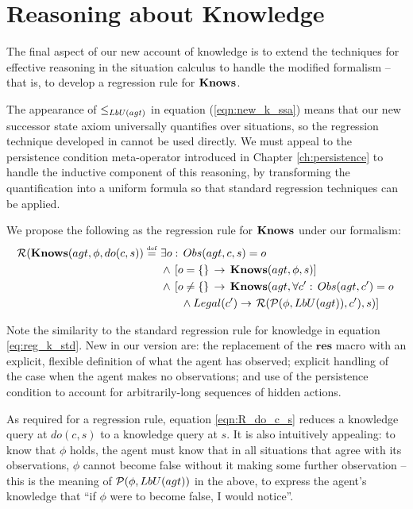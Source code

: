 \section{Reasoning about Knowledge\label{sec:Knowledge:Regression}}

The final aspect of our new account of knowledge is to extend the
techniques for effective reasoning in the situation calculus to handle
the modified formalism -- that is, to develop a regression rule for
$\mathbf{Knows}$.

The appearance of $\leq_{LbU(agt)}$ in equation (\ref{eqn:new_k_ssa})
means that our new successor state axiom universally quantifies over
situations, so the regression technique developed in \citep{scherl03sc_knowledge}
cannot be used directly. We must appeal to the persistence condition
meta-operator introduced in Chapter \ref{ch:persistence} to handle
the inductive component of this reasoning, by transforming the quantification
into a uniform formula so that standard regression techniques can
be applied.

We propose the following as the regression rule for $\mathbf{Knows}$ under
our formalism:\begin{align}
\mathcal{R}(\mathbf{Knows}(agt,\phi,do(c,s))\stackrel{\mbox{\tiny def}}{=}\,\, & \exists o:\, Obs(agt,c,s)=o\nonumber \\
 & \wedge\,\left[o=\{\}\,\rightarrow\,\mathbf{Knows}(agt,\phi,s)\right]\nonumber \\
 & \wedge\,\left[o\neq\{\}\,\rightarrow\,\mathbf{Knows}(agt,\forall c':\, Obs(agt,c')=o\right.\nonumber \\
 & \,\,\,\,\,\,\,\,\,\,\,\wedge Legal(c')\rightarrow\left.\mathcal{R}(\mathcal{P}(\phi,LbU(agt)),c'),s)\right]\label{eqn:R_do_c_s}\end{align}


Note the similarity to the standard regression rule for knowledge
in equation \eqref{eq:reg_k_std}. New in our version are: the replacement
of the $\mathbf{res}$ macro with an explicit, flexible definition
of what the agent has observed; explicit handling of the case when
the agent makes no observations; and use of the persistence condition
to account for arbitrarily-long sequences of hidden actions.

As required for a regression rule, equation \eqref{eqn:R_do_c_s}
reduces a knowledge query at $do(c,s)$ to a knowledge query at $s$.
It is also intuitively appealing: to know that $\phi$ holds, the
agent must know that in all situations that agree with its observations,
$\phi$ cannot become false without it making some further observation
-- this is the meaning of $\mathcal{P}(\phi,LbU(agt))$ in the above, to
express the agent's knowledge that {}``if $\phi$ were to become
false, I would notice''.

